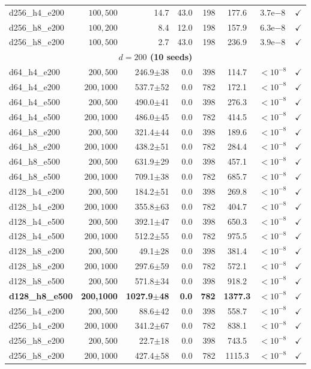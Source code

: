 \documentclass[12pt,a4paper]{article}
\begin{document}
\begin{table}[H]
\begin{tabular}{lrrrrccl}
d256\_h4\_e200 & $100,500$ & 14.7 & 43.0 & 198 & 177.6 & $3.7$e$-8$ & $\checkmark$ \\
d256\_h8\_e200 & $100,200$ & 8.4 & 12.0 & 198 & 157.9 & $6.3$e$-8$ & $\checkmark$ \\
d256\_h8\_e200 & $100,500$ & 2.7 & 43.0 & 198 & 236.9 & $3.9$e$-8$ & $\checkmark$ \\
\midrule
\multicolumn{8}{c}{\textbf{$d=200$ (10 seeds)}} \\
\midrule
d64\_h4\_e200 & $200,500$ & 246.9$\pm$38 & 0.0 & 398 & 114.7 & $<10^{-8}$ & $\checkmark$ \\
d64\_h4\_e200 & $200,1000$ & 537.7$\pm$52 & 0.0 & 782 & 172.1 & $<10^{-8}$ & $\checkmark$ \\
d64\_h4\_e500 & $200,500$ & 490.0$\pm$41 & 0.0 & 398 & 276.3 & $<10^{-8}$ & $\checkmark$ \\
d64\_h4\_e500 & $200,1000$ & 486.0$\pm$45 & 0.0 & 782 & 414.5 & $<10^{-8}$ & $\checkmark$ \\
d64\_h8\_e200 & $200,500$ & 321.4$\pm$44 & 0.0 & 398 & 189.6 & $<10^{-8}$ & $\checkmark$ \\
d64\_h8\_e200 & $200,1000$ & 438.2$\pm$51 & 0.0 & 782 & 284.4 & $<10^{-8}$ & $\checkmark$ \\
d64\_h8\_e500 & $200,500$ & 631.9$\pm$29 & 0.0 & 398 & 457.1 & $<10^{-8}$ & $\checkmark$ \\
d64\_h8\_e500 & $200,1000$ & 709.1$\pm$38 & 0.0 & 782 & 685.7 & $<10^{-8}$ & $\checkmark$ \\
d128\_h4\_e200 & $200,500$ & 184.2$\pm$51 & 0.0 & 398 & 269.8 & $<10^{-8}$ & $\checkmark$ \\
d128\_h4\_e200 & $200,1000$ & 355.8$\pm$63 & 0.0 & 782 & 404.7 & $<10^{-8}$ & $\checkmark$ \\
d128\_h4\_e500 & $200,500$ & 392.1$\pm$47 & 0.0 & 398 & 650.3 & $<10^{-8}$ & $\checkmark$ \\
d128\_h4\_e500 & $200,1000$ & 512.2$\pm$55 & 0.0 & 782 & 975.5 & $<10^{-8}$ & $\checkmark$ \\
d128\_h8\_e200 & $200,500$ & 49.1$\pm$28 & 0.0 & 398 & 381.4 & $<10^{-8}$ & $\checkmark$ \\
d128\_h8\_e200 & $200,1000$ & 297.6$\pm$59 & 0.0 & 782 & 572.1 & $<10^{-8}$ & $\checkmark$ \\
d128\_h8\_e500 & $200,500$ & 571.8$\pm$34 & 0.0 & 398 & 918.2 & $<10^{-8}$ & $\checkmark$ \\
\textbf{d128\_h8\_e500} & \textbf{200,1000} & \textbf{1027.9$\pm$48} & \textbf{0.0} & \textbf{782} & \textbf{1377.3} & \textbf{$<10^{-8}$} & \textbf{$\checkmark$} \\
d256\_h4\_e200 & $200,500$ & 88.6$\pm$42 & 0.0 & 398 & 558.7 & $<10^{-8}$ & $\checkmark$ \\
d256\_h4\_e200 & $200,1000$ & 341.2$\pm$67 & 0.0 & 782 & 838.1 & $<10^{-8}$ & $\checkmark$ \\
d256\_h8\_e200 & $200,500$ & 22.7$\pm$18 & 0.0 & 398 & 743.5 & $<10^{-8}$ & $\checkmark$ \\
d256\_h8\_e200 & $200,1000$ & 427.4$\pm$58 & 0.0 & 782 & 1115.3 & $<10^{-8}$ & $\checkmark$ \\
\bottomrule
\end{tabular}
\end{table}
\end{document}
